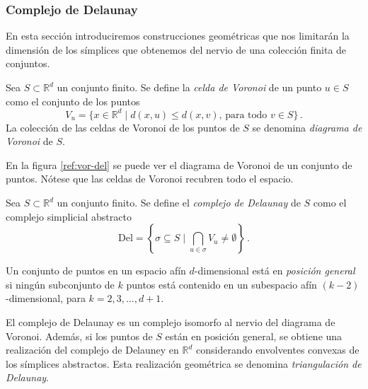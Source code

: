 \subsubsection*{Complejo de Delaunay}
En esta sección introduciremos construcciones geométricas que nos limitarán la dimensión de los símplices que obtenemos del nervio de una colección finita de conjuntos.

\begin{definition}
Sea $S \subset \mathbb{R}^d$ un conjunto finito. Se define la \emph{celda de Voronoi} de un punto $u \in S$ como el conjunto de los puntos
\[
V_u = \{ x \in \mathbb{R}^d \mid d(x,u) \leq d(x,v) \text{, para todo } v \in S\}\,.
\]
La colección de las celdas de Voronoi de los puntos de $S$ se denomina \emph{diagrama de Voronoi} de $S$.
\end{definition}

En la figura \ref{ref:vor-del} se puede ver el diagrama de Voronoi de un conjunto de puntos. Nótese que las celdas de Voronoi recubren todo el espacio.

\begin{definition}
Sea $S \subset \mathbb{R}^d$ un conjunto finito. Se define el \emph{complejo de Delaunay} de $S$ como el complejo simplicial abstracto 
\[
\text{Del} = \left\{\sigma \subseteq S \mid \bigcap_{u \in \sigma}V_u \neq \emptyset \right\}\,.
\] 
\end{definition}

\begin{definition}
Un conjunto de puntos en un espacio afín $d$-dimensional está en \emph{posición general} si ningún subconjunto de $k$ puntos está contenido en un subespacio afín $(k-2)$-dimensional, para $k = 2, 3, ..., d + 1$.
\end{definition}


El complejo de Delaunay es un complejo isomorfo al nervio del diagrama de Voronoi. Además, si los puntos de $S$ están en posición general, se obtiene una realización del complejo de Delauney en $\mathbb{R}^d$ considerando envolventes convexas de los símplices abstractos. Esta realización geométrica se denomina \emph{triangulación de Delaunay}.

